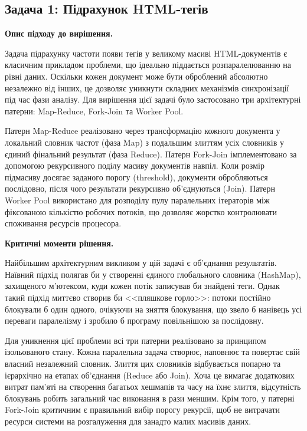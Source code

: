 \documentclass[14pt, a4paper]{extreport}
\begin{document}
	\subsection{Задача 1: Підрахунок HTML-тегів}
	
	\textbf{Опис підходу до вирішення.}
	
	Задача підрахунку частоти появи тегів у великому масиві HTML-документів є класичним прикладом проблеми, що ідеально піддається розпаралелюванню на рівні даних. Оскільки кожен документ може бути оброблений абсолютно незалежно від інших, це дозволяє уникнути складних механізмів синхронізації під час фази аналізу. Для вирішення цієї задачі було застосовано три архітектурні патерни: Map-Reduce, Fork-Join та Worker Pool. 
	
	Патерн Map-Reduce реалізовано через трансформацію кожного документа у локальний словник частот (фаза Map) з подальшим злиттям усіх словників у єдиний фінальний результат (фаза Reduce). Патерн Fork-Join імплементовано за допомогою рекурсивного поділу масиву документів навпіл. Коли розмір підмасиву досягає заданого порогу (threshold), документи обробляються послідовно, після чого результати рекурсивно об'єднуються (Join). Патерн Worker Pool використано для розподілу пулу паралельних ітераторів між фіксованою кількістю робочих потоків, що дозволяє жорстко контролювати споживання ресурсів процесора.
	
	\textbf{Критичні моменти рішення.}
	
	Найбільшим архітектурним викликом у цій задачі є об'єднання результатів. Наївний підхід полягав би у створенні єдиного глобального словника (HashMap), захищеного м'ютексом, куди кожен потік записував би знайдені теги. Однак такий підхід миттєво створив би <<пляшкове горло>>: потоки постійно блокували б один одного, очікуючи на зняття блокування, що звело б нанівець усі переваги паралелізму і зробило б програму повільнішою за послідовну.
	
	Для уникнення цієї проблеми всі три патерни реалізовано за принципом ізольованого стану. Кожна паралельна задача створює, наповнює та повертає свій власний незалежний словник. Злиття цих словників відбувається попарно та ієрархічно на етапах об'єднання (Reduce або Join). Хоча це вимагає додаткових витрат пам'яті на створення багатьох хешмапів та часу на їхнє злиття, відсутність блокувань робить загальний час виконання в рази меншим. Крім того, у патерні Fork-Join критичним є правильний вибір порогу рекурсії, щоб не витрачати ресурси системи на розгалуження для занадто малих масивів даних.
	
\end{document}

